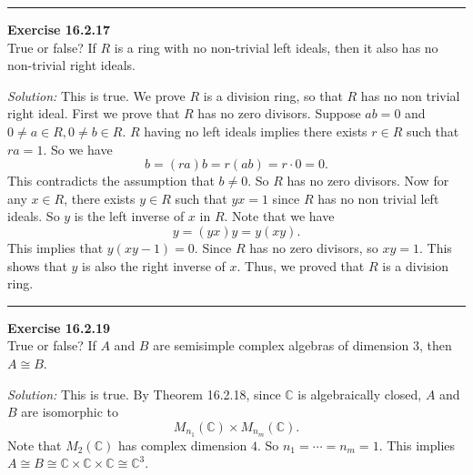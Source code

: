 \documentclass[a4paper, 12pt]{article}
\newenvironment{problem}[2][Exercise]
    { \begin{mdframed}[backgroundcolor=gray!20] \textbf{#1 #2} \\}
    {  \end{mdframed}}
\newenvironment{solution}
    {\textit{Solution:}}
    {}
\begin{document}
\noindent\rule{7in}{2.8pt}
\begin{problem}{16.2.17}
True or false? If \(R\) is a ring with no non-trivial left ideals, then it also has no non-trivial right ideals.
\end{problem}
\begin{solution}
This is true. We prove \(R\) is a division ring, so that \(R\) has no non trivial right ideal. First we prove that \(R\) has no zero divisors. Suppose 
\(ab=0\) and \(0\neq a\in R, 0\neq b\in R\). \(R\) having no left ideals implies there exists \(r\in R\) such that \(ra=1\). So we have 
\[b=(ra)b=r(ab)=r\cdot 0=0.\]
This contradicts the assumption that \(b\neq 0\). So \(R\) has no zero divisors. Now for any \(x\in R\), there exists \(y\in R\) such that \(yx=1\) since \(R\) has no non trivial left 
ideals. So \(y\) is the left inverse of \(x\) in \(R\). Note that we have
\[y=(yx)y=y(xy).\]
This implies that \(y(xy-1)=0\). Since \(R\) has no zero divisors, so \(xy=1\). This shows that \(y\) is also the right inverse of \(x\). Thus, we proved that \(R\) is a division ring.  
\end{solution}

\noindent\rule{7in}{2.8pt}
\begin{problem}{16.2.19}
True or false? If \(A\) and \(B\) are semisimple complex algebras of dimension \(3\), then \(A\cong B\).
\end{problem}
\begin{solution}
This is true. By Theorem 16.2.18, since \(\mathbb{C}\) is algebraically closed, \(A\) and \(B\) are isomorphic to 
\[M_{n_1}(\mathbb{C})\times M_{n_m}(\mathbb{C}).\]
Note that \(M_2(\mathbb{C})\) has complex dimension \(4\). So \(n_1=\cdots=n_m=1\). This implies \(A\cong B\cong \mathbb{C}\times \mathbb{C}\times \mathbb{C}\cong \mathbb{C}^3\).
\end{solution}
\end{document}
